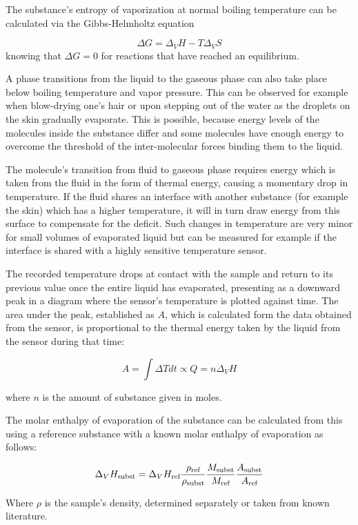 The substance’s entropy of vaporization at normal boiling temperature can be calculated via the Gibbs-Helmholtz equation 

\begin{equation}\label{eq:gibbs} %
    \Delta G = \Delta_VH - T \Delta_VS
\end{equation}
knowing that $\Delta G = 0$ for reactions that have reached an equilibrium.

A phase transitions from the liquid to the gaseous phase can also take place below boiling temperature and vapor pressure. This can be observed for example when blow-drying one’s hair or upon stepping out of the water as the droplets on the skin gradually evaporate. This is possible, because energy levels of the molecules inside the substance differ and some molecules have enough energy to overcome the threshold of the inter-molecular forces binding them to the liquid.

The molecule’s transition from fluid to gaseous phase requires energy which is taken from the fluid in the form of thermal energy, causing a momentary drop in temperature. If the fluid shares an interface with another substance (for example the skin) which has a higher temperature, it will in turn draw energy from this surface to compensate for the deficit.
Such changes in temperature are very minor for small volumes of evaporated liquid but can be measured for example if the interface is shared with a highly sensitive temperature sensor. 

The recorded temperature drops at contact with the sample and return to its previous value once the entire liquid has evaporated, presenting as a downward peak in a diagram where the sensor’s temperature is plotted against time. The area under the peak, established as $A$, which is calculated form the data obtained from the sensor, is proportional to the thermal energy taken by the liquid from the sensor during that time:

\begin{equation} \label{eq:6.15} %
    A = \int \Delta T dt \propto Q = n \Delta_VH
\end{equation}

where $n$ is the amount of substance given in moles.

The molar enthalpy of evaporation of the substance can be calculated from this using a reference substance with a known molar enthalpy of evaporation as follows:

\begin{equation} \label{eq:6.18} %
    \Delta_VH_{\text{subst}} = \Delta_VH_{\text{ref}} {\rho_{\text{ref}} \over \rho_{\text{subst}}} {M_{\text{subst}} \over M_{\text{ref}}} {A_{\text{subst}} \over A_{\text{ref}}}
\end{equation}

Where $\rho$ is the sample’s density, determined separately or taken from known literature.

